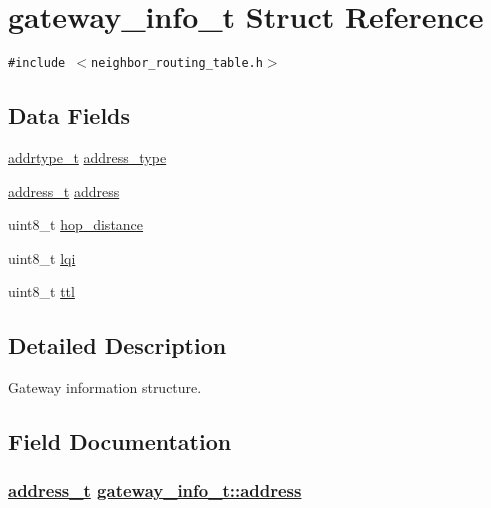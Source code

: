 \hypertarget{structgateway__info__t}{
\section{gateway\_\-info\_\-t Struct Reference}
\label{structgateway__info__t}
}
{\tt \#include $<$neighbor\_\-routing\_\-table.h$>$}

\subsection*{Data Fields}
\begin{CompactItemize}
\item 
\hyperlink{address_8h_faf76b5591da0abd0584dec411d0551d}{addrtype\_\-t} \hyperlink{structgateway__info__t_95a861899c3eea8087b0ce133de42d80}{address\_\-type}
\item 
\hyperlink{address_8h_65ce5a1faf29ab669a1d3dc6ce26c2ab}{address\_\-t} \hyperlink{structgateway__info__t_cf46061809e578c4acf9efe936340e6d}{address}
\item 
uint8\_\-t \hyperlink{structgateway__info__t_93b635756750f6abf21486d5b408e666}{hop\_\-distance}
\item 
uint8\_\-t \hyperlink{structgateway__info__t_4075557274a491d052944514dff46f47}{lqi}
\item 
uint8\_\-t \hyperlink{structgateway__info__t_bf2c4546f04ee1131d3ff827921844e0}{ttl}
\end{CompactItemize}


\subsection{Detailed Description}
Gateway information structure. 



\subsection{Field Documentation}
\hypertarget{structgateway__info__t_cf46061809e578c4acf9efe936340e6d}{
\subsubsection[address]{\setlength{\rightskip}{0pt plus 5cm}\hyperlink{address_8h_65ce5a1faf29ab669a1d3dc6ce26c2ab}{address\_\-t} \hyperlink{structgateway__info__t_cf46061809e578c4acf9efe936340e6d}{gateway\_\-info\_\-t::address}}}
\label{structgateway__info__t_cf46061809e578c4acf9efe936340e6d}


